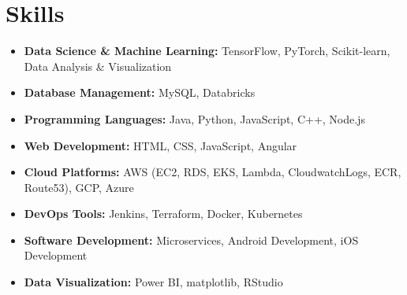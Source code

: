 \documentclass[11pt,a4paper,sans]{moderncv}
\begin{document}
\section{Skills}
{\begin{itemize}[label=\textbullet]
\item {\textbf{Data Science \& Machine Learning:} TensorFlow, PyTorch, Scikit-learn, Data Analysis \& Visualization}
\item {\textbf{Database Management:} MySQL, Databricks}
\item {\textbf{Programming Languages:} Java, Python, JavaScript, C++, Node.js}
\item {\textbf{Web Development:} HTML, CSS, JavaScript, Angular}
\item {\textbf{Cloud Platforms:} AWS (EC2, RDS, EKS, Lambda, CloudwatchLogs, ECR, Route53), GCP, Azure}
\item {\textbf{DevOps Tools:} Jenkins, Terraform, Docker, Kubernetes}
\item {\textbf{Software Development:} Microservices, Android Development, iOS Development}
\item {\textbf{Data Visualization:} Power BI, matplotlib, RStudio}
\end{itemize}}

\iffalse
\section{Languages}
\begin{multicols}{2}
    \begin{itemize}[label=\textbullet]
    \item \textbf{English} [Native]
    \item {\textbf{French} [Basic] - Learning}
    \item {\textbf{Spanish} [Native]}
    \item {\textbf{German} [Basic] - A1}
    \end{itemize}
\end{multicols}
\fi
\end{document}
